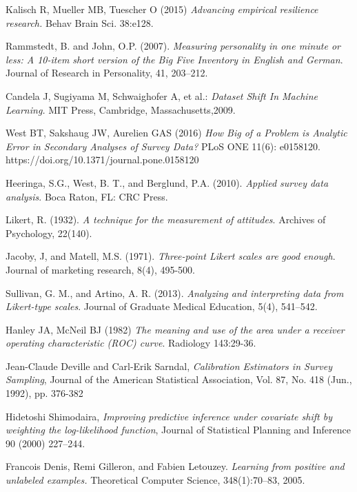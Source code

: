 \begin{thebibliography}{9}

Kalisch R, Mueller MB, Tuescher O (2015) \textit{Advancing empirical resilience research.} Behav Brain Sci. 38:e128.

Rammstedt, B. and John, O.P. (2007). \textit{Measuring personality in one minute or less: A 10-item short version of  the Big Five Inventory in English and German}. Journal of Research in Personality, 41, 203–212. 

Candela J, Sugiyama M, Schwaighofer A, et al.: \textit{Dataset Shift In Machine Learning.} MIT Press, Cambridge, Massachusetts,2009.

West BT, Sakshaug JW, Aurelien GAS (2016) \textit{How Big of a Problem is Analytic Error in Secondary Analyses of Survey Data?} PLoS ONE 11(6): e0158120. https://doi.org/10.1371/journal.pone.0158120

Heeringa, S.G., West, B. T., and Berglund, P.A. (2010). \textit{Applied survey data analysis}. Boca Raton, FL: CRC Press.

Likert, R. (1932). \textit{A technique for the measurement of attitudes}. Archives of Psychology, 22(140).

Jacoby, J, and Matell, M.S. (1971). \textit{Three-point Likert scales are good enough}. Journal of marketing research, 8(4), 495-500.

Sullivan, G. M., and Artino, A. R. (2013). \textit{Analyzing and interpreting data from Likert-type scales}. Journal of Graduate Medical Education, 5(4), 541–542. 

Hanley JA, McNeil BJ (1982) \textit{The meaning and use of the area under a receiver operating characteristic (ROC) curve}. Radiology 143:29-36. 

Jean-Claude Deville and Carl-Erik Sarndal, \textit{Calibration Estimators in Survey Sampling}, Journal of the American Statistical Association, Vol. 87, No. 418 (Jun., 1992), pp. 376-382

Hidetoshi Shimodaira, \textit{Improving predictive inference under covariate shift by weighting the log-likelihood function}, Journal of Statistical Planning and Inference 90 (2000) 227–244.

 Francois Denis, Remi Gilleron, and Fabien Letouzey. \textit{Learning from positive and unlabeled examples.} Theoretical Computer Science, 348(1):70–83, 2005. 


\end{thebibliography}
